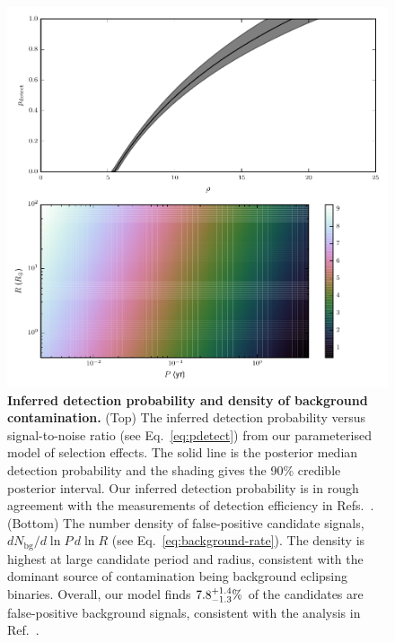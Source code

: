 \documentclass{nature}
\newcommand{\Nbg}{N_\mathrm{bg}}
\begin{document}
\begin{figure}
  \includegraphics[width=\columnwidth]{bg}
  \caption{\label{fig:npl} \textbf{Inferred detection probability and
      density of background contamination.} (Top) The inferred
    detection probability versus signal-to-noise ratio (see
    Eq.\ \eqref{eq:pdetect}) from our parameterised model of selection
    effects.  The solid line is the posterior median detection
    probability and the shading gives the 90\% credible posterior
    interval.  Our inferred detection probability is in rough
    agreement with the measurements of detection efficiency in
    Refs.\ \cite{Borucki2011,Batalha2013}.  (Bottom) The number
    density of false-positive candidate signals, $d\Nbg/d\ln P \, d\ln
    R$ (see Eq.\ \eqref{eq:background-rate}).  The density is highest
    at large candidate period and radius, consistent with the dominant
    source of contamination being background eclipsing
    binaries\cite{Fressin2013}.  Overall, our model finds $7.8_{-1.3}^{+1.4}\%$
    of the candidates are false-positive background signals,
    consistent with the analysis in Ref.\ \cite{Fressin2013}.}
\end{figure}
\end{document}
